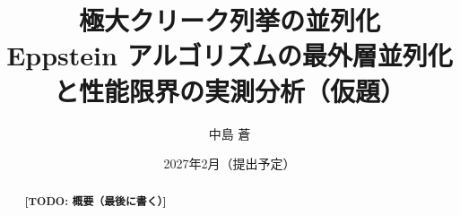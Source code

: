 \documentclass[report, jafontscale=1.0]{jlreq}
\title{極大クリーク列挙の並列化\\
  \large Eppstein アルゴリズムの最外層並列化と性能限界の実測分析（仮題）}
\author{中島 蒼}
\date{2027年2月（提出予定）}
\newcommand{\todo}[1]{\par\noindent\textbf{[TODO: #1]}\par}
\begin{document}
\maketitle

\begin{abstract}
\todo{概要（最後に書く）}
\end{abstract}

\tableofcontents










\end{document}
